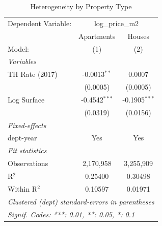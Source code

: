 \begin{table}[htbp]
   \caption{\label{tab:hetero} Heterogeneity by Property Type}
   \centering
   \begin{tabular}{lcc}
      \tabularnewline \midrule \midrule
      Dependent Variable: & \multicolumn{2}{c}{log\_price\_m2}\\
                     & Apartments      & Houses \\   
      Model:         & (1)             & (2)\\  
      \midrule
      \emph{Variables}\\
      TH Rate (2017) & -0.0013$^{**}$  & 0.0007\\   
                     & (0.0005)        & (0.0005)\\   
      Log Surface    & -0.4542$^{***}$ & -0.1905$^{***}$\\   
                     & (0.0319)        & (0.0156)\\   
      \midrule
      \emph{Fixed-effects}\\
      dept-year      & Yes             & Yes\\  
      \midrule
      \emph{Fit statistics}\\
      Observations   & 2,170,958       & 3,255,909\\  
      R$^2$          & 0.25400         & 0.30498\\  
      Within R$^2$   & 0.10597         & 0.01971\\  
      \midrule \midrule
      \multicolumn{3}{l}{\emph{Clustered (dept) standard-errors in parentheses}}\\
      \multicolumn{3}{l}{\emph{Signif. Codes: ***: 0.01, **: 0.05, *: 0.1}}\\
   \end{tabular}
\end{table}
